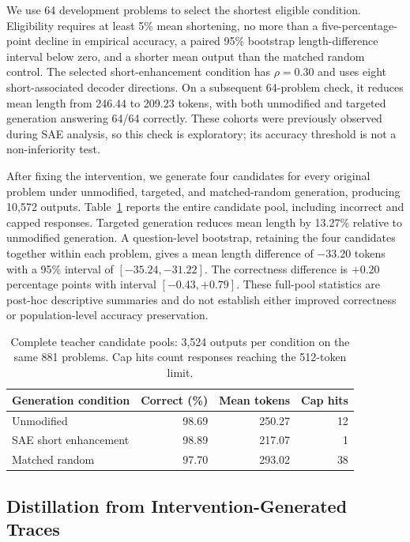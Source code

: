 We use 64 development problems to select the shortest eligible condition.
Eligibility requires at least 5\% mean shortening, no more than a five-percentage-point decline in empirical accuracy, a paired 95\% bootstrap length-difference interval below zero, and a shorter mean output than the matched random control.
The selected short-enhancement condition has $\rho=0.30$ and uses eight short-associated decoder directions.
On a subsequent 64-problem check, it reduces mean length from 246.44 to 209.23 tokens, with both unmodified and targeted generation answering 64/64 correctly.
These cohorts were previously observed during SAE analysis, so this check is exploratory; its accuracy threshold is not a non-inferiority test.

After fixing the intervention, we generate four candidates for every original problem under unmodified, targeted, and matched-random generation, producing 10,572 outputs.
Table~\ref{tab:teacher_generation} reports the entire candidate pool, including incorrect and capped responses.
Targeted generation reduces mean length by 13.27\% relative to unmodified generation.
A question-level bootstrap, retaining the four candidates together within each problem, gives a mean length difference of $-33.20$ tokens with a 95\% interval of $[-35.24,-31.22]$.
The correctness difference is $+0.20$ percentage points with interval $[-0.43,+0.79]$.
These full-pool statistics are post-hoc descriptive summaries and do not establish either improved correctness or population-level accuracy preservation.

\begin{table}[t]
\centering
\small
\begin{tabular}{lrrr}
\hline
Generation condition & Correct (\%) & Mean tokens & Cap hits \\
\hline
Unmodified & 98.69 & 250.27 & 12 \\
SAE short enhancement & 98.89 & 217.07 & 1 \\
Matched random & 97.70 & 293.02 & 38 \\
\hline
\end{tabular}
\caption{Complete teacher candidate pools: 3,524 outputs per condition on the same 881 problems. Cap hits count responses reaching the 512-token limit.}
\label{tab:teacher_generation}
\end{table}

\subsection{Distillation from Intervention-Generated Traces}
\label{sec:student_results}

